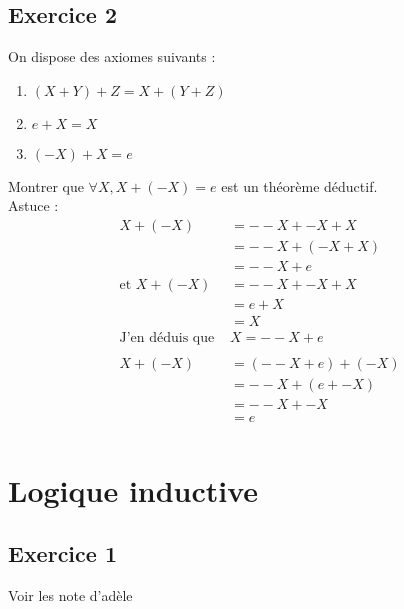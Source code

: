 \documentclass[11pt,a4paper]{article}
\begin{document}
	\subsection{Exercice 2}
	On dispose des axiomes suivants :
	\begin{enumerate}
		\item $(X + Y) + Z = X + (Y + Z)$
		\item $e + X = X$
		\item $(-X) + X = e$
	\end{enumerate}
	Montrer que $\forall X, X + (-X) = e$ est un théorème déductif.\\
	Astuce :\\
	\begin{align*}
		X + (-X) &= --X + -X +X\\
		&= --X + (-X + X)\\
		&= --X + e\\
		\text{et } X + (-X) &= --X + -X +X\\
		&= e + X\\
		&= X\\
		\text{J'en déduis que } &X = --X + e\\ \\
		X + (-X) &= (--X + e) + (-X)\\
		&= --X + (e + -X)\\
		&= --X + -X\\
		&= e\\
	\end{align*}
	\newpage
	\section{Logique inductive}
	\subsection{Exercice 1}
	Voir les note d'adèle
	
\end{document}

